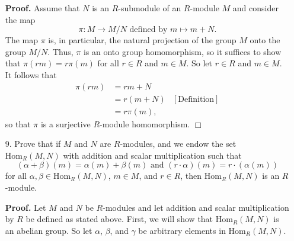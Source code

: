 \documentclass[9pt]{article}
\newcommand{\qed}{\hfill \ensuremath{\Box}}
\begin{document}
\begin{enumerate}
      \textbf{Proof.} Assume that $N$ is an $R$-submodule of an $R$-module $M$
      and consider the map
      $$\pi : M \rightarrow M/N \text{ defined by } m \mapsto m + N.$$
      The map $\pi$ is, in particular, the natural projection of the group $M$
      onto the group $M/N$. Thus, $\pi$ is an onto group homomorphism, so it
      suffices to show that $\pi(rm) = r\pi(m)$ for all $r \in R$ and $m \in M$.
      So let $r \in R$ and $m \in M$. It follows that
      \begin{align*}
         \pi(rm) &= rm + N \\
            &= r(m + N) &[\text{Definition}] \\
            &= r\pi(m),
      \end{align*}
      so that $\pi$ is a surjective $R$-module homomorphism. \qed
   \item[9.]   Prove that if $M$ and $N$ are $R$-modules, and we endow the set
               $\text{Hom}_R(M, N)$ with addition and scalar multiplication such
               that
               $$(\alpha + \beta)(m) = \alpha(m) + \beta(m) \text{ and }
                 (r \cdot \alpha)(m) = r \cdot(\alpha(m))$$
               for all $\alpha, \beta \in \text{Hom}_R(M, N)$, $m \in M$, and
               $r \in R$, then $\text{Hom}_R(M, N)$ is an $R$-module.

      \textbf{Proof.} Let $M$ and $N$ be $R$-modules and let addition and scalar
      multiplication by $R$ be defined as stated above. First, we will show that
      $\text{Hom}_R(M, N)$ is an abelian group. So let $\alpha$, $\beta$, and
      $\gamma$ be arbitrary elements in $\text{Hom}_R(M, N)$.


\end{enumerate}
\end{document}
